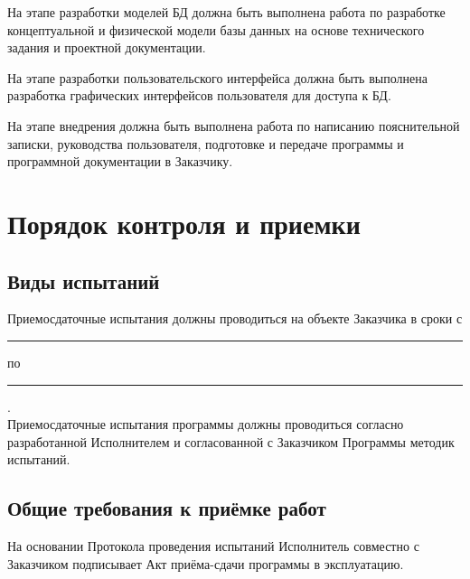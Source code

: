     На этапе разработки моделей БД должна быть выполнена работа по разработке концептуальной и физической модели базы данных на основе технического задания и проектной документации.

    На этапе разработки пользовательского интерфейса должна быть выполнена разработка графических интерфейсов пользователя для доступа к БД.

    На этапе внедрения должна быть выполнена работа по написанию пояснительной записки, руководства пользователя, подготовке и передаче программы и программной документации в Заказчику.
\section{Порядок контроля и приемки}
  \subsection{Виды испытаний}
    Приемосдаточные испытания должны проводиться на объекте Заказчика в сроки с \rule{3cm}{.1pt} по \rule{3cm}{.1pt}  .\\
    Приемосдаточные испытания программы должны проводиться согласно разработанной Исполнителем и согласованной с Заказчиком Программы методик испытаний.
  \subsection{Общие требования к приёмке работ}
    На основании Протокола проведения испытаний Исполнитель совместно с Заказчиком подписывает Акт приёма-сдачи программы в эксплуатацию.
\endinput
